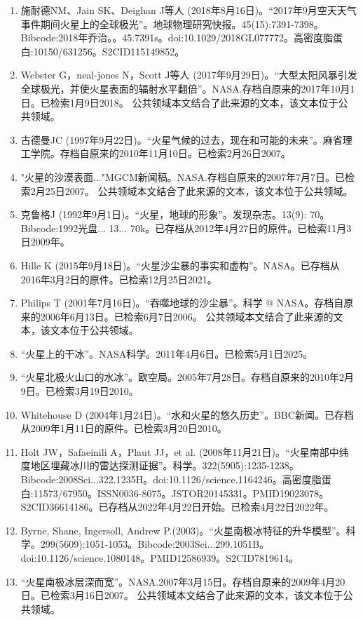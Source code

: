 \begin{enumerate}
\item 施耐德NM、Jain SK、Deighan J等人 (2018年8月16日)。“2017年9月空天天气事件期间火星上的全球极光”。地球物理研究快报。45(15):7391-7398。Bibcode:2018年乔治。。45.7391s。doi:10.1029/2018GL077772。高密度脂蛋白:10150/631256。S2CID115149852。 
\item Webster G，neal-jones N，Scott J等人 (2017年9月29日)。“大型太阳风暴引发全球极光，并使火星表面的辐射水平翻倍”。NASA.存档自原来的2017年10月1日。已检索1月9日2018。 公共领域本文结合了此来源的文本，该文本位于公共领域。
\item 古德曼JC (1997年9月22日)。“火星气候的过去，现在和可能的未来”。麻省理工学院。存档自原来的2010年11月10日。已检索2月26日2007。
\item "火星的沙漠表面..."MGCM新闻稿。NASA.存档自原来的2007年7月7日。已检索2月25日2007。 公共领域本文结合了此来源的文本，该文本位于公共领域。
\item 克鲁格J (1992年9月1日)。“火星，地球的形象”。发现杂志。13(9): 70。Bibcode:1992光盘... 13... 70k。已存档从2012年4月27日的原件。已检索11月3日2009年。
\item Hille K (2015年9月18日)。“火星沙尘暴的事实和虚构”。NASA。已存档从2016年3月2日的原件。已检索12月25日2021。
\item Philips T (2001年7月16日)。“吞噬地球的沙尘暴”。科学 @ NASA。存档自原来的2006年6月13日。已检索6月7日2006。 公共领域本文结合了此来源的文本，该文本位于公共领域。
\item “火星上的干冰”。NASA科学。2011年4月6日。已检索5月1日2025。
\item “火星北极火山口的水冰”。欧空局。2005年7月28日。存档自原来的2010年2月9日。已检索3月19日2010。
\item Whitehouse D (2004年1月24日)。“水和火星的悠久历史”。BBC新闻。已存档从2009年1月11日的原件。已检索3月20日2010。
\item Holt JW，Safaeinili A，Plaut JJ，et al. (2008年11月21日)。“火星南部中纬度地区埋藏冰川的雷达探测证据”。科学。322(5905):1235-1238。Bibcode:2008Sci...322.1235H。doi:10.1126/science.1164246。高密度脂蛋白:11573/67950。ISSN0036-8075。JSTOR20145331。PMID19023078。S2CID36614186。已存档从2022年4月22日开始。已检索4月22日2022年。    
\item Byrne, Shane, Ingersoll, Andrew P.(2003)。“火星南极冰特征的升华模型”。科学。299(5609):1051-1053。Bibcode:2003Sci...299.1051B。doi:10.1126/science.1080148。PMID12586939。S2CID7819614。  
\item “火星南极冰层深而宽”。NASA.2007年3月15日。存档自原来的2009年4月20日。已检索3月16日2007。 公共领域本文结合了此来源的文本，该文本位于公共领域。

\end{enumerate}
